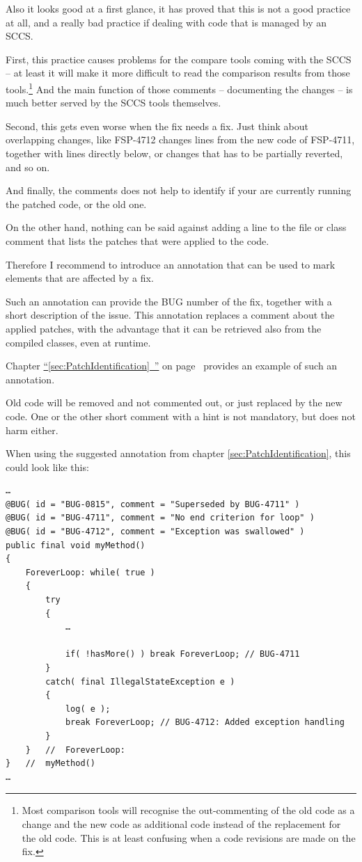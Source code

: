 \documentclass[11pt,a4paper, titlepage, parskip=half, headsepline, footsepline, cleardoublepage=current, headheight=1cm]{scrbook}
\newcommand*{\tqfullvref}[1]{\hyperref[{#1}]{“\ref*{#1}~\nameref*{#1}”} on page~\pageref{#1}}
\newcommand*{\tqref}[1]{\hyperref[{#1}]{\ref*{#1}}}
\begin{document}
Also it looks good at a first glance, it has proved that this is not a good practice at all, and a really bad practice if dealing with code that is managed by an SCCS.

First, this practice causes problems for the compare tools coming with the SCCS – at least it will make it more difficult to read the comparison results from those tools.\footnote{Most comparison tools will recognise the out-commenting of the old code as a change and the new code as additional code instead of the replacement for the old code. This is at least confusing when a code revisions are made on the fix.} And the main function of those comments – documenting the changes – is much better served by the SCCS tools themselves.

Second, this gets even worse when the fix needs a fix. Just think about overlapping changes, like FSP-4712 changes lines from the new code of FSP-4711, together with lines directly below, or changes that has to be partially reverted, and so on.

And finally, the comments does not help to identify if your are currently running the patched code, or the old one.

On the other hand, nothing can be said against adding a line to the file or class comment that lists the patches that were applied to the code.

Therefore I recommend to introduce an annotation that can be used to mark elements that are affected by a fix.

Such an annotation can provide the BUG number of the fix, together with a short description of the issue. This annotation replaces a comment about the applied patches, with the advantage that it can be retrieved also from the compiled classes, even at runtime.

Chapter \tqfullvref{sec:PatchIdentification} provides an example of such an annotation.

Old code will be removed and not commented out, or just replaced by the new code. One or the other short comment with a hint is not mandatory, but does not harm either.

When using the suggested annotation from chapter \tqref{sec:PatchIdentification}, this could look like this:
\begin{lstlisting}
…
@BUG( id = "BUG-0815", comment = "Superseded by BUG-4711" )
@BUG( id = "BUG-4711", comment = "No end criterion for loop" )
@BUG( id = "BUG-4712", comment = "Exception was swallowed" )
public final void myMethod()
{
    ForeverLoop: while( true )
    {
        try
        {
            …
            
            if( !hasMore() ) break ForeverLoop; // BUG-4711
        }
        catch( final IllegalStateException e )
        {
            log( e );
            break ForeverLoop; // BUG-4712: Added exception handling
        }
    }   //  ForeverLoop:
}   //  myMethod()
…
\end{lstlisting}
\end{document}
